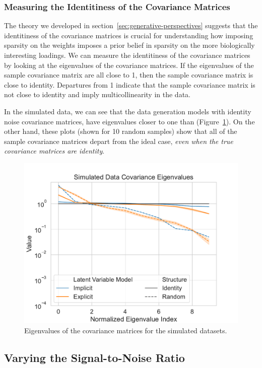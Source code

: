 \subsubsection{Measuring the Identitiness of the Covariance Matrices}
The theory we developed in section~\ref{sec:generative-perspectives} suggests that the identitiness of the covariance matrices is crucial for understanding how imposing sparsity on the \gls{weights} imposes a prior belief in sparsity on the more biologically interesting loadings.
We can measure the identitiness of the covariance matrices by looking at the eigenvalues of the covariance matrices.
If the eigenvalues of the sample covariance matrix are all close to 1, then the sample covariance matrix is close to identity.
Departures from 1 indicate that the sample covariance matrix is not close to identity and imply multicollinearity in the data.

In the simulated data, we can see that the data generation models with identity noise covariance matrices, have eigenvalues closer to one than (Figure~\ref{fig:covariance-eigenvalues-simulated-low}).
On the other hand, these plots (shown for 10 random samples) show that all of the sample covariance matrices depart from the ideal case, \textit{even when the true covariance matrices are identity}.

\begin{figure}
    \centering
    \includegraphics[width=0.8\linewidth]{figures/covariance/simulated_covariance_eigenvalues_low}
    \caption{Eigenvalues of the covariance matrices for the simulated datasets.}\label{fig:covariance-eigenvalues-simulated-low}
\end{figure}


\subsection{Varying the Signal-to-Noise Ratio}

